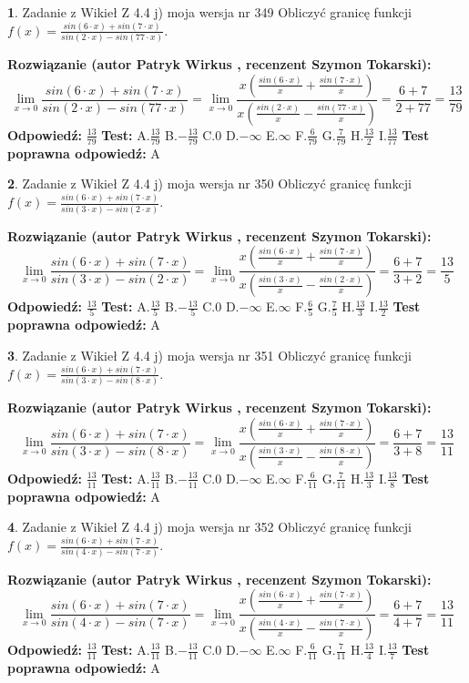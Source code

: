 \documentclass[12pt, a4paper]{article}
\theoremstyle{definition} %
\newtheorem{zad}{}
\newcommand{\zadStart}[1]{\begin{zad}#1\newline}
\newcommand{\zadStop}{\end{zad}}
\newcommand{\rozwStart}[2]{\noindent \textbf{Rozwiązanie (autor #1 , recenzent #2): }\newline}
\newcommand{\rozwStop}{\newline}
\newcommand{\odpStart}{\noindent \textbf{Odpowiedź:}\newline}
\newcommand{\odpStop}{\newline}
\newcommand{\testStart}{\noindent \textbf{Test:}\newline}
\newcommand{\testStop}{\newline}
\newcommand{\kluczStart}{\noindent \textbf{Test poprawna odpowiedź:}\newline}
\newcommand{\kluczStop}{\newline}
\begin{document}
\zadStart{Zadanie z Wikieł Z 4.4 j) moja wersja nr 349}
Obliczyć granicę funkcji $f(x)=\frac{sin(6\cdot x) +sin(7\cdot x)}{sin(2\cdot x) -sin(77\cdot x)}$.
\zadStop
\rozwStart{Patryk Wirkus}{Szymon Tokarski}
$$\lim\limits_{x\to 0}\frac{sin(6\cdot x) +sin(7\cdot x)}{sin(2\cdot x) -sin(77\cdot x)}=\lim\limits_{x\to 0}\frac{x(\frac{sin(6\cdot x)}{x}+\frac{sin(7\cdot x)}{x})}{x(\frac{sin(2\cdot x)}{x}-\frac{sin(77\cdot x)}{x})}=\frac{6+7}{2+77} = \frac{13}{79}$$
\rozwStop
\odpStart
$\frac{13}{79}$
\odpStop
\testStart
A.$\frac{13}{79}$
B.$-\frac{13}{79}$
C.$0$
D.$-\infty$
E.$\infty$
F.$\frac{6}{79}$
G.$\frac{7}{79}$
H.$\frac{13}{2}$
I.$\frac{13}{77}$
\testStop
\kluczStart
A
\kluczStop



\zadStart{Zadanie z Wikieł Z 4.4 j) moja wersja nr 350}
Obliczyć granicę funkcji $f(x)=\frac{sin(6\cdot x) +sin(7\cdot x)}{sin(3\cdot x) -sin(2\cdot x)}$.
\zadStop
\rozwStart{Patryk Wirkus}{Szymon Tokarski}
$$\lim\limits_{x\to 0}\frac{sin(6\cdot x) +sin(7\cdot x)}{sin(3\cdot x) -sin(2\cdot x)}=\lim\limits_{x\to 0}\frac{x(\frac{sin(6\cdot x)}{x}+\frac{sin(7\cdot x)}{x})}{x(\frac{sin(3\cdot x)}{x}-\frac{sin(2\cdot x)}{x})}=\frac{6+7}{3+2} = \frac{13}{5}$$
\rozwStop
\odpStart
$\frac{13}{5}$
\odpStop
\testStart
A.$\frac{13}{5}$
B.$-\frac{13}{5}$
C.$0$
D.$-\infty$
E.$\infty$
F.$\frac{6}{5}$
G.$\frac{7}{5}$
H.$\frac{13}{3}$
I.$\frac{13}{2}$
\testStop
\kluczStart
A
\kluczStop



\zadStart{Zadanie z Wikieł Z 4.4 j) moja wersja nr 351}
Obliczyć granicę funkcji $f(x)=\frac{sin(6\cdot x) +sin(7\cdot x)}{sin(3\cdot x) -sin(8\cdot x)}$.
\zadStop
\rozwStart{Patryk Wirkus}{Szymon Tokarski}
$$\lim\limits_{x\to 0}\frac{sin(6\cdot x) +sin(7\cdot x)}{sin(3\cdot x) -sin(8\cdot x)}=\lim\limits_{x\to 0}\frac{x(\frac{sin(6\cdot x)}{x}+\frac{sin(7\cdot x)}{x})}{x(\frac{sin(3\cdot x)}{x}-\frac{sin(8\cdot x)}{x})}=\frac{6+7}{3+8} = \frac{13}{11}$$
\rozwStop
\odpStart
$\frac{13}{11}$
\odpStop
\testStart
A.$\frac{13}{11}$
B.$-\frac{13}{11}$
C.$0$
D.$-\infty$
E.$\infty$
F.$\frac{6}{11}$
G.$\frac{7}{11}$
H.$\frac{13}{3}$
I.$\frac{13}{8}$
\testStop
\kluczStart
A
\kluczStop



\zadStart{Zadanie z Wikieł Z 4.4 j) moja wersja nr 352}
Obliczyć granicę funkcji $f(x)=\frac{sin(6\cdot x) +sin(7\cdot x)}{sin(4\cdot x) -sin(7\cdot x)}$.
\zadStop
\rozwStart{Patryk Wirkus}{Szymon Tokarski}
$$\lim\limits_{x\to 0}\frac{sin(6\cdot x) +sin(7\cdot x)}{sin(4\cdot x) -sin(7\cdot x)}=\lim\limits_{x\to 0}\frac{x(\frac{sin(6\cdot x)}{x}+\frac{sin(7\cdot x)}{x})}{x(\frac{sin(4\cdot x)}{x}-\frac{sin(7\cdot x)}{x})}=\frac{6+7}{4+7} = \frac{13}{11}$$
\rozwStop
\odpStart
$\frac{13}{11}$
\odpStop
\testStart
A.$\frac{13}{11}$
B.$-\frac{13}{11}$
C.$0$
D.$-\infty$
E.$\infty$
F.$\frac{6}{11}$
G.$\frac{7}{11}$
H.$\frac{13}{4}$
I.$\frac{13}{7}$
\testStop
\kluczStart
A
\kluczStop
\end{document}
